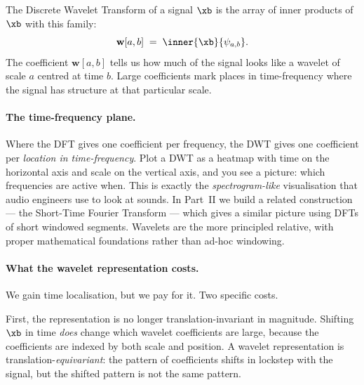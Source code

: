 The Discrete Wavelet Transform of a signal $\xb$ is the array of inner
products of $\xb$ with this family:
\begin{equation}
    \mathbf{w}[a, b] \;=\; \inner{\xb}{\psi_{a, b}}.
\end{equation}
The coefficient $\mathbf{w}[a, b]$ tells us how much of the signal looks
like a wavelet of scale $a$ centred at time $b$.  Large coefficients
mark places in time-frequency where the signal has structure at that
particular scale.


\paragraph{The time-frequency plane.}  Where the DFT gives one
coefficient per frequency, the DWT gives one coefficient per
\emph{location in time-frequency}.  Plot a DWT as a heatmap with time
on the horizontal axis and scale on the vertical axis, and you see a
picture: which frequencies are active when.  This is exactly the
\emph{spectrogram-like} visualisation that audio engineers use to look
at sounds.  In Part~II we build a related construction --- the Short-Time
Fourier Transform --- which gives a similar picture using DFTs of
short windowed segments.  Wavelets are the more principled relative,
with proper mathematical foundations rather than ad-hoc windowing.

\paragraph{What the wavelet representation costs.}  We gain time
localisation, but we pay for it.  Two specific costs.

First, the representation is no longer translation-invariant in
magnitude.  Shifting $\xb$ in time \emph{does} change which wavelet
coefficients are large, because the coefficients are indexed by both
scale and position.  A wavelet representation is translation-\emph{equivariant}:
the pattern of coefficients shifts in lockstep with the signal, but the
shifted pattern is not the same pattern.

